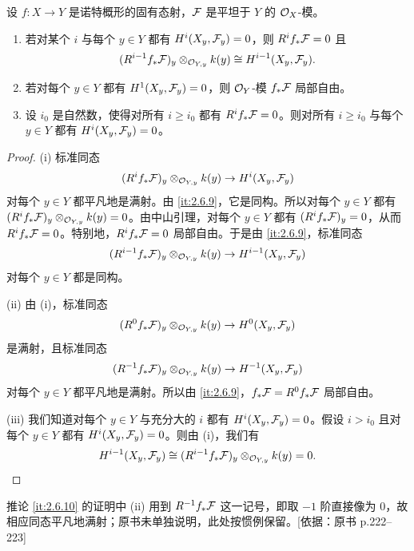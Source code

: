 \begin{corollary}\label{it:2.6.10}
设 $f\colon X\to Y$ 是诺特概形的固有态射，$\mathcal{F}$ 是平坦于 $Y$ 的 $\mathcal{O}_X$-模。
\begin{enumerate}[label=(\roman*)]
\item 若对某个 $i$ 与每个 $y\in Y$ 都有 $H^i(X_y,\mathcal{F}_y)=0$，则 $R^if_*\mathcal{F}=0$ 且
\[
(R^{i-1}f_*\mathcal{F})_y\otimes_{\mathcal{O}_{Y,y}}k(y)\cong H^{i-1}(X_y,\mathcal{F}_y).
\]
\item 若对每个 $y\in Y$ 都有 $H^1(X_y,\mathcal{F}_y)=0$，则 $\mathcal{O}_Y$-模 $f_*\mathcal{F}$ 局部自由。
\item 设 $i_0$ 是自然数，使得对所有 $i\ge i_0$ 都有 $R^if_*\mathcal{F}=0$。则对所有 $i\ge i_0$ 与每个 $y\in Y$ 都有 $H^i(X_y,\mathcal{F}_y)=0$。
\end{enumerate}
\end{corollary}

\begin{proof}
(i) 标准同态
\[
(R^if_*\mathcal{F})_y\otimes_{\mathcal{O}_{Y,y}}k(y)\to H^i(X_y,\mathcal{F}_y)
\]
对每个 $y\in Y$ 都平凡地是满射。由 \ref{it:2.6.9}，它是同构。所以对每个 $y\in Y$ 都有 $(R^if_*\mathcal{F})_y\otimes_{\mathcal{O}_{Y,y}}k(y)=0$。由中山引理，对每个 $y\in Y$ 都有 $(R^if_*\mathcal{F})_y=0$，从而 $R^if_*\mathcal{F}=0$。特别地，$R^if_*\mathcal{F}=0$ 局部自由。于是由 \ref{it:2.6.9}，标准同态
\[
(R^{i-1}f_*\mathcal{F})_y\otimes_{\mathcal{O}_{Y,y}}k(y)\to H^{i-1}(X_y,\mathcal{F}_y)
\]
对每个 $y\in Y$ 都是同构。

(ii) 由 (i)，标准同态
\[
(R^0f_*\mathcal{F})_y\otimes_{\mathcal{O}_{Y,y}}k(y)\to H^0(X_y,\mathcal{F}_y)
\]
是满射，且标准同态
\[
(R^{-1}f_*\mathcal{F})_y\otimes_{\mathcal{O}_{Y,y}}k(y)\to H^{-1}(X_y,\mathcal{F}_y)
\]
对每个 $y\in Y$ 都平凡地是满射。所以由 \ref{it:2.6.9}，$f_*\mathcal{F}=R^0f_*\mathcal{F}$ 局部自由。

(iii) 我们知道对每个 $y\in Y$ 与充分大的 $i$ 都有 $H^i(X_y,\mathcal{F}_y)=0$。假设 $i>i_0$ 且对每个 $y\in Y$ 都有 $H^i(X_y,\mathcal{F}_y)=0$。则由 (i)，我们有
\[
H^{i-1}(X_y,\mathcal{F}_y)\cong(R^{i-1}f_*\mathcal{F})_y\otimes_{\mathcal{O}_{Y,y}}k(y)=0.
\]
\end{proof}

\begin{tnote}
推论 \ref{it:2.6.10} 的证明中 (ii) 用到 $R^{-1}f_*\mathcal{F}$ 这一记号，即取 $-1$ 阶直接像为 $0$，故相应同态平凡地满射；原书未单独说明，此处按惯例保留。[依据：原书 p.222–223]
\end{tnote}
